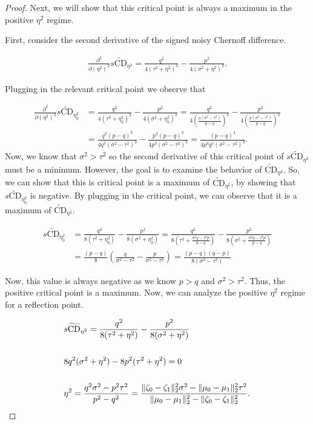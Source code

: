 \documentclass[10pt,a4paper]{amsart}
\begin{document}
\begin{proof}
Next, we will show that this critical point is always a maximum in the positive $\eta^2$ regime.

First, consider the second derivative of the signed noisy Chernoff difference.

\begin{align}
    \frac{\partial^2}{\partial (\eta^2)^2}s\widetilde{\text{CD}}_{\eta^2} =  \frac{q^2}{4(\tau^2 + \eta^2)^3} - \frac{p^2}{4(\sigma^2 + \eta^2)^3}.
\end{align}

Plugging in the relevant critical point we observe that

\begin{align}
    \frac{\partial^2}{\partial (\eta^2)^2 }s  \widetilde{\text{CD}}_{\eta_0^2} &=  \frac{q^2}{4(\tau^2 + \eta_0^2)^3} - \frac{p^2}{4(\sigma^2 + \eta_0^2)^3} = \frac{q^2}{4(\frac{q(\sigma^2-\tau^2)}{p-q})^3} -  \frac{p^2}{4(\frac{p(\sigma^2-\tau^2)}{p-q})^3} \\&=  \frac{q^2(p-q)^3}{4q^3(\sigma^2-\tau^2)^3} - \frac{p^2(p-q)^3}{4p^3(\sigma^2-\tau^2)^3} = \frac{(p-q)^4}{4p^3q^3(\sigma^2-\tau^2)^3}.
\end{align}
Now, we know that $\sigma^2 > \tau^2$ so the second derivative of  this critical point of $s\widetilde{\text{CD}}_{\eta^2}$ must be a minimum. However, the goal is to examine the behavior of $\widetilde{\text{CD}}_{\eta^2}$. So, we can show that this is critical point is a maximum of $\widetilde{\text{CD}}_{\eta^2}$, by showing that $s\widetilde{\text{CD}}_{\eta_0^2}$ is negative. By plugging in the critical point, we can observe that it is a maximum of $\widetilde{\text{CD}}_{\eta^2}$.

\begin{align}
    s\widetilde{\text{CD}}_{\eta_0^2} &= \frac{q^2}{8(\tau^2 + \eta_0^2)} - \frac{p^2}{8(\sigma^2 + \eta_0^2)} = \frac{q^2}{8(\tau^2 + \frac{\sigma^2q-\tau^2p}{p-q})} - \frac{p^2}{8(\sigma^2 + \frac{\sigma^2q-\tau^2p}{p-q})} \\&= \frac{(p-q)}{8}(\frac{q}{\sigma^2-\tau^2}-\frac{p}{\sigma^2-\tau^2}) = \frac{(p-q)(q-p)}{8(\sigma^2 - \tau^2)}
\end{align}


Now, this value is always negative as we know $p > q$ and $\sigma^2 > \tau^2$. Thus, the positive critical point is a maximum. Now, we can analyze the positive $\eta^2$ regime for a reflection point. 

\begin{align}
    &s\widetilde{\text{CD}}_{\eta^2} = \frac{q^2}{8(\tau^2 + \eta^2)} - \frac{p^2}{8(\sigma^2 + \eta^2)} \\ \notag
    \\
    &8q^2(\sigma^2 + \eta^2) - 8p^2(\tau^2 + \eta^2) = 0 \\ \notag
    \\
    &\eta^2 = \frac{q^2\sigma^2-p^2\tau^2}{p^2-q^2} = \frac{\|\zeta_0 - \zeta_1\|_2^2\sigma^2-\|\mu_0 - \mu_1\|_2^2\tau^2}{\|\mu_0 - \mu_1\|_2^2-\|\zeta_0 - \zeta_1\|_2^2}.
\end{align}






\end{proof}
\end{document}
